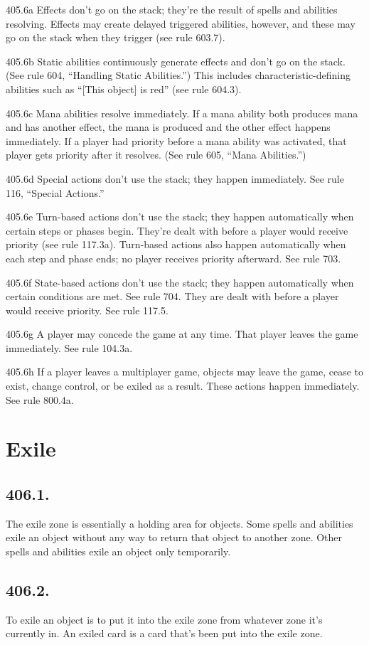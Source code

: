 405.6a Effects don’t go on the stack; they’re the result of spells and abilities resolving. Effects may create delayed triggered abilities, however, and these may go on the stack when they trigger (see rule 603.7).

405.6b Static abilities continuously generate effects and don’t go on the stack. (See rule 604, “Handling Static Abilities.”) This includes characteristic-defining abilities such as “[This object] is red” (see rule 604.3).

405.6c Mana abilities resolve immediately. If a mana ability both produces mana and has another effect, the mana is produced and the other effect happens immediately. If a player had priority before a mana ability was activated, that player gets priority after it resolves. (See rule 605, “Mana Abilities.”)

405.6d Special actions don’t use the stack; they happen immediately. See rule 116, “Special Actions.”

405.6e Turn-based actions don’t use the stack; they happen automatically when certain steps or phases begin. They’re dealt with before a player would receive priority (see rule 117.3a). Turn-based actions also happen automatically when each step and phase ends; no player receives priority afterward. See rule 703.

405.6f State-based actions don’t use the stack; they happen automatically when certain conditions are met. See rule 704. They are dealt with before a player would receive priority. See rule 117.5.

405.6g A player may concede the game at any time. That player leaves the game immediately. See rule 104.3a.

405.6h If a player leaves a multiplayer game, objects may leave the game, cease to exist, change control, or be exiled as a result. These actions happen immediately. See rule 800.4a.

\section{Exile}
\subsection*{406.1.}
The exile zone is essentially a holding area for objects. Some spells and abilities exile an object without any way to return that object to another zone. Other spells and abilities exile an object only temporarily.

\subsection*{406.2.}
To exile an object is to put it into the exile zone from whatever zone it’s currently in. An exiled card is a card that’s been put into the exile zone.

